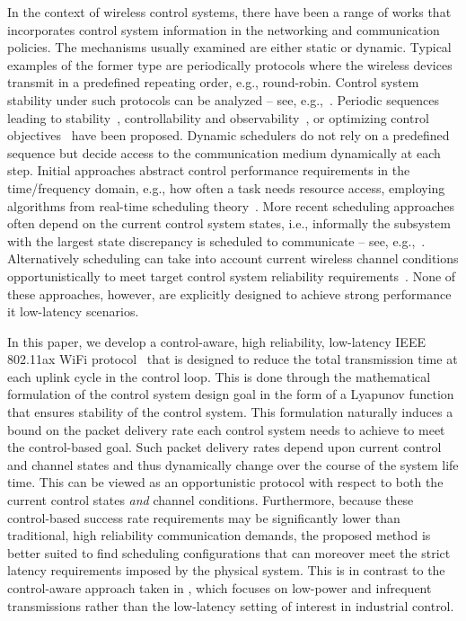 In the context of wireless control systems, there have been a range of works that incorporates control system information in the networking and communication policies.
%
The mechanisms usually examined are either static or dynamic. Typical examples of the former type are periodically protocols where the wireless devices transmit in a predefined repeating order, e.g., round-robin. Control system stability under such protocols can be analyzed -- see, e.g.,~\cite{Hespanha_survey, Schenato_foundations, Donkers_switched, Branicky_stability}. Periodic sequences leading to stability~\cite{Hristu_shared_feedback}, controllability and observability~\cite{Hristu_communication_control}, or optimizing control objectives~\cite{LeNy_resource_LQR,Meier_measurement_control, Scheduling_control_combinatorics} have been proposed.
%
Dynamic schedulers do not rely on a predefined sequence but decide access to the communication medium dynamically at each step. %
Initial approaches abstract control performance requirements in the time/frequency domain, e.g., how often a task needs resource access, employing algorithms from real-time scheduling theory~\cite{Branicky_RM, Liu_Real_time_systems}. More recent scheduling approaches often depend on the current control system states, i.e., informally the subsystem with the largest state discrepancy is scheduled to communicate -- see, e.g.,~\cite{Donkers_switched, Walsh_stability, Hristu_Kumar_interrupt_based, Egerstedt_queue, Hirche_Scheduling_Price, Cervin_event_scheduling, mamduhi2014event,shi2011optimal,han2017optimal}.
%
Alternatively scheduling can take into account current wireless channel conditions opportunistically to meet target control system reliability requirements~\cite{GatsisEtal15}. None of these approaches, however, are explicitly designed to achieve strong performance it low-latency scenarios.



In this paper, we develop a control-aware, high reliability, low-latency IEEE 802.11ax WiFi protocol~\cite{bellalta2016ieee} that is designed to reduce the total transmission time at each uplink cycle in the control loop. This is done through the mathematical formulation of the control system design goal in the form of a Lyapunov function that ensures stability of the control system. This formulation naturally induces a bound on the packet delivery rate each control system needs to achieve to meet the control-based goal. Such packet delivery rates depend upon current control and channel states and thus dynamically change over the course of the system life time. This can be viewed as an opportunistic protocol with respect to both the current control states \emph{and} channel conditions. Furthermore, because these control-based success rate requirements may be significantly lower than traditional, high reliability communication demands, the proposed method is better suited to find scheduling configurations that can moreover meet the strict latency requirements imposed by the physical system. This is in contrast to the control-aware approach taken in \cite{GatsisEtal15}, which focuses on low-power and infrequent transmissions rather than the low-latency setting of interest in industrial control.

